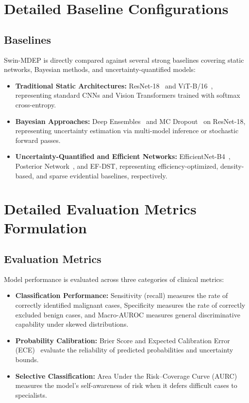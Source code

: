 \documentclass[letterpaper]{article} %
\begin{document}
\section{Detailed Baseline Configurations}
\subsection{Baselines}\label{subsec:baselines}

Swin-MDEP is directly compared against several strong baselines covering static networks, Bayesian methods, and uncertainty-quantified models:
\begin{itemize}
    \item \textbf{Traditional Static Architectures:} ResNet-18~\cite{he2016deep} and ViT-B/16~\cite{dosovitskiy2021image}, representing standard CNNs and Vision Transformers trained with softmax cross-entropy.
    \item \textbf{Bayesian Approaches:} Deep Ensembles~\cite{lakshminarayanan2017simple} and MC Dropout~\cite{gal2016dropout} on ResNet-18, representing uncertainty estimation via multi-model inference or stochastic forward passes.
    \item \textbf{Uncertainty-Quantified and Efficient Networks:} EfficientNet-B4~\cite{tan2019efficientnet}, Posterior Network~\cite{charpentier2020posterior}, and EF-DST, representing efficiency-optimized, density-based, and sparse evidential baselines, respectively.
\end{itemize}


\section{Detailed Evaluation Metrics Formulation}
\subsection{Evaluation Metrics}\label{subsec:metrics}

Model performance is evaluated across three categories of clinical metrics:
\begin{itemize}
    \item \textbf{Classification Performance:} Sensitivity (recall) measures the rate of correctly identified malignant cases, Specificity measures the rate of correctly excluded benign cases, and Macro-AUROC measures general discriminative capability under skewed distributions.
    \item \textbf{Probability Calibration:} Brier Score and Expected Calibration Error (ECE)~\cite{naeini2015obtaining} evaluate the reliability of predicted probabilities and uncertainty bounds.
    \item \textbf{Selective Classification:} Area Under the Risk--Coverage Curve (AURC)~\cite{geifman2017selective, geifman2019selectivenet, jaeger2023call} measures the model's self-awareness of risk when it defers difficult cases to specialists.
\end{itemize}
\end{document}
